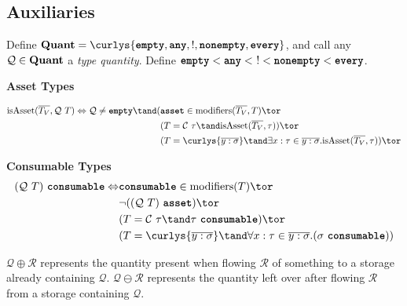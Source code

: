 \documentclass[10pt]{article}
\begin{document}

\subsection{Auxiliaries}
\begin{definition}
    Define $\Quant = \curlys{\emptyq, \any, \exactlyone, \nonempty, \every}$, and call any $\mathcal{Q} \in \textbf{Quant}$ a \emph{type quantity}.
    Define $\textbf{\texttt{empty}} < \textbf{\texttt{any}} < \,\, ! < \textbf{\texttt{nonempty}} < \textbf{\texttt{every}}$.
\end{definition}

 \textbf{Asset Types}

\begin{align*}
    \isAsset(\overline{T_V}, \mathcal{Q}~T) \iff \mathcal{Q} \neq \emptyq \tand (& \asset \in \modifiers(\overline{T_V}, T) \tor \\
                                                                                 & (T = \mathcal{C}~\tau \tand \isAsset(\overline{T_V}, \tau)) \tor \\
                                                                                 & (T = \curlys{\overline{y : \sigma}} \tand \exists x : \tau \in \overline{y : \sigma}. \isAsset(\overline{T_V}, \tau)) \tor \\
\end{align*}

\framebox{$\tau~\consumable$} \textbf{Consumable Types}
\begin{align*}
    (\mathcal{Q}~T)~\consumable \iff &\consumable \in \modifiers(T) \tor \\
                                     &\lnot((\mathcal{Q}~T)~\asset) \tor \\
                                     &(T = \mathcal{C}~\tau \tand \tau~\consumable) \tor \\
                                     &(T = \curlys{\overline{y : \sigma}} \tand \forall x : \tau \in \overline{y : \sigma}. (\sigma~\consumable))
\end{align*}

$\mathcal{Q} \oplus \mathcal{R}$ represents the quantity present when flowing $\mathcal{R}$ of something to a storage already containing $\mathcal{Q}$.
$\mathcal{Q} \ominus \mathcal{R}$ represents the quantity left over after flowing $\mathcal{R}$ from a storage containing $\mathcal{Q}$.
\end{document}
